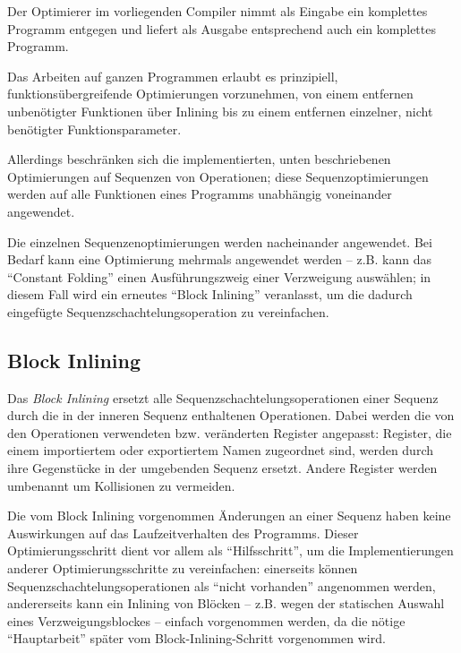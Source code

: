 \documentclass[twoside,a4paper,fleqn,12pt]{book}
\begin{document}

Der Optimierer im vorliegenden Compiler nimmt als Eingabe ein komplettes Programm entgegen
und liefert als Ausgabe entsprechend auch ein komplettes Programm.

Das Arbeiten auf ganzen Programmen erlaubt es prinzipiell, funktionsübergreifende Optimierungen
vorzunehmen, von einem entfernen unbenötigter Funktionen über Inlining bis zu einem entfernen
einzelner, nicht benötigter Funktionsparameter.

Allerdings beschränken sich die implementierten, unten beschriebenen Optimierungen auf Sequenzen
von Operationen; diese Sequenzoptimierungen werden auf alle Funktionen eines Programms unabhängig
voneinander angewendet.

Die einzelnen Sequenzenoptimierungen werden nacheinander angewendet. Bei Bedarf kann eine
Optimierung mehrmals angewendet werden -- z.B. kann das ``Constant Folding'' einen Ausführungszweig
einer Verzweigung auswählen; in diesem Fall wird ein erneutes ``Block Inlining'' veranlasst,
um die dadurch eingefügte Sequenzschachtelungsoperation zu vereinfachen.

\subsection{Block Inlining}

Das \emph{Block Inlining} ersetzt alle Sequenzschachtelungsoperationen einer Sequenz durch
die in der inneren Sequenz enthaltenen Operationen. Dabei werden die von den
Operationen verwendeten bzw. veränderten Register angepasst: Register, die einem importiertem
oder exportiertem Namen zugeordnet sind, werden durch ihre Gegenstücke in der umgebenden
Sequenz ersetzt. Andere Register werden umbenannt um Kollisionen zu vermeiden.

Die vom Block Inlining vorgenommen Änderungen an einer Sequenz haben keine Auswirkungen auf das
Laufzeitverhalten des Programms. Dieser Optimierungsschritt dient vor allem als "`Hilfsschritt"',
um die Implementierungen anderer Optimierungsschritte zu vereinfachen: einerseits können
Sequenzschachtelungsoperationen als "`nicht vorhanden"' angenommen werden, andererseits kann
ein Inlining von Blöcken -- z.B. wegen der statischen Auswahl eines Verzweigungsblockes --
einfach vorgenommen werden, da die nötige "`Hauptarbeit"' später vom Block-Inlining-Schritt
vorgenommen wird.
\end{document}
